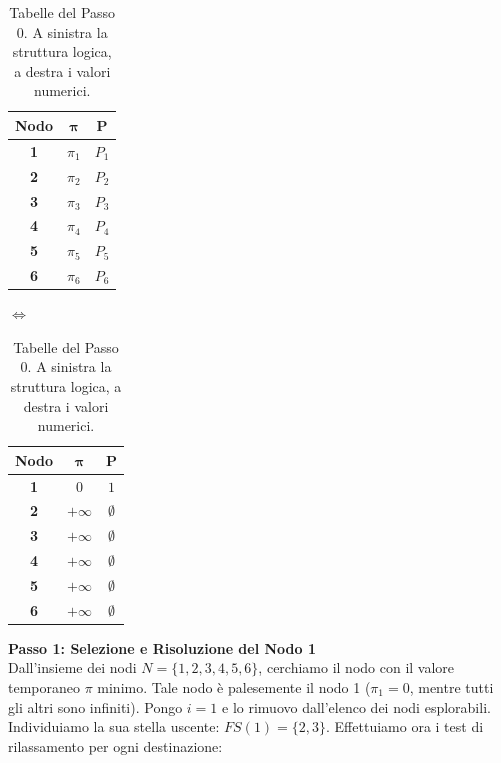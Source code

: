 \documentclass[12pt, a4paper]{article}
\begin{document}
	\begin{table}[H]
		\centering
		\begin{minipage}{0.4\textwidth}
			\centering
			\begin{tabular}{|c|c|c|}
				\hline
				\textbf{Nodo} & $\boldsymbol{\pi}$ & $\mathbf{P}$ \\
				\hline
				\textbf{1} & $\pi_1$ & $P_1$ \\
				\textbf{2} & $\pi_2$ & $P_2$ \\
				\textbf{3} & $\pi_3$ & $P_3$ \\
				\textbf{4} & $\pi_4$ & $P_4$ \\
				\textbf{5} & $\pi_5$ & $P_5$ \\
				\textbf{6} & $\pi_6$ & $P_6$ \\
				\hline
			\end{tabular}
		\end{minipage}
		\begin{minipage}{0.1\textwidth}
			\centering
			$\iff$
		\end{minipage}
		\begin{minipage}{0.4\textwidth}
			\centering
			\begin{tabular}{|c|c|c|}
				\hline
				\textbf{Nodo} & $\boldsymbol{\pi}$ & $\mathbf{P}$ \\
				\hline
				\textbf{1} & $0$ & $1$ \\
				\textbf{2} & $+\infty$ & $\emptyset$ \\
				\textbf{3} & $+\infty$ & $\emptyset$ \\
				\textbf{4} & $+\infty$ & $\emptyset$ \\
				\textbf{5} & $+\infty$ & $\emptyset$ \\
				\textbf{6} & $+\infty$ & $\emptyset$ \\
				\hline
			\end{tabular}
		\end{minipage}
		\caption*{Tabelle del Passo 0. A sinistra la struttura logica, a destra i valori numerici.}
	\end{table}
	
	\textbf{Passo 1: Selezione e Risoluzione del Nodo 1}\\
	Dall'insieme dei nodi $N = \{1, 2, 3, 4, 5, 6\}$, cerchiamo il nodo con il valore temporaneo $\pi$ minimo. Tale nodo è palesemente il nodo 1 ($\pi_1 = 0$, mentre tutti gli altri sono infiniti). 
	Pongo $i = 1$ e lo rimuovo dall'elenco dei nodi esplorabili.
	Individuiamo la sua stella uscente: $FS(1) = \{2, 3\}$.
	Effettuiamo ora i test di rilassamento per ogni destinazione:
	
\end{document}

